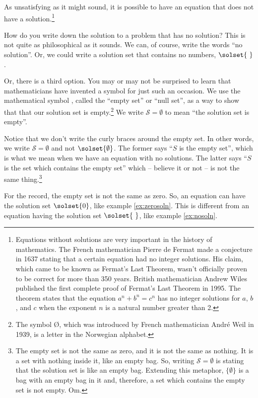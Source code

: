 As unsatisfying as it might sound, it is possible to have an equation that does not have a solution.\footnote{Equations without solutions are very important in the history of mathematics. The French mathematician Pierre de Fermat made a conjecture in 1637 stating that a certain equation had no integer solutions. His claim, which came to be known as Fermat's Last Theorem, wasn't officially proven to be correct for more than 350 years. British mathematician Andrew Wiles published the first complete proof of Fermat's Last Theorem in 1995. The theorem states that the equation $a^n + b^n = c^n$ has no integer solutions for $a$, $b$, and $c$ when the exponent $n$ is a natural number greater than 2.}

How do you write down the solution to a problem that has no solution? This is not quite as philosophical as it sounds. We can, of course, write the words ``no solution''. Or, we could write a solution set that contains no numbers, $\solset{~}$.

Or, there is a third option. You may or may not be surprised to learn that mathematicians have invented a symbol for just such an occasion. We use the mathematical symbol \emptyset, called the ``empty set'' or ``null set'', as a way to show that that our solution set is empty.\footnote{The symbol \O, which was introduced by French mathematician Andr\'e Weil in 1939, is a letter in the Norwegian alphabet.} We write $\mathcal{S} = \emptyset$ to mean ``the solution set is empty''.

Notice that we don't write the curly braces around the empty set. In other words, we write $\mathcal{S}=\emptyset$ and not $\solset{\emptyset}$. The former says ``$S$ is the empty set'', which is what we mean when we have an equation with no solutions. The latter says ``$S$ is the set which contains the empty set'' which -- believe it or not -- is not the same thing.\footnote{The empty set is not the same as zero, and it is not the same as nothing. It is a set with nothing inside it, like an empty bag. So, writing $\mathcal{S} = \emptyset$ is stating that the solution set is like an empty bag. Extending this metaphor, $\{\emptyset\}$ is a bag with an empty bag in it and, therefore, a set which contains the empty set is not empty. Om.}

For the record, the empty set is not the same as zero. So, an equation can have the solution set $\solset{0}$, like example \cref{ex:zerosoln}. This is different from an equation having the solution set $\solset{~}$, like example \cref{ex:nosoln}.


